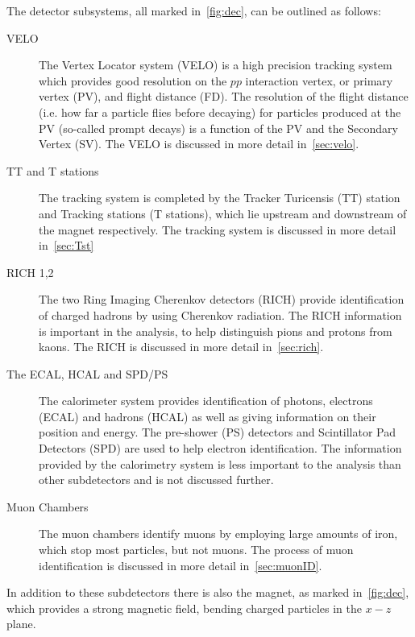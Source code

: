 The detector subsystems, all marked in~\autoref{fig:dec}, can be outlined as follows:
\begin{description}
\item [VELO] The Vertex Locator system (\Gls{VELO}) is a high precision tracking system which provides good resolution on the $pp$ interaction vertex, or primary vertex (\Gls{PV}), and flight distance (\Gls{FD}). The resolution of the flight distance (i.e. how far a particle flies before decaying) for particles produced at the PV (so-called \gls{prompt} decays) is a function of the PV and the Secondary Vertex (SV). The VELO is discussed in more detail in~\autoref{sec:velo}.
\item [TT and T stations] The tracking system is completed by the Tracker Turicensis (TT) station and Tracking stations (T stations), which lie upstream and downstream of the magnet respectively. The tracking system is discussed in more detail in~\autoref{sec:Tst} %
\item [RICH 1,2] The two Ring Imaging Cherenkov detectors (\Gls{RICH}) provide identification of charged hadrons by using Cherenkov radiation. The RICH information is important in the \Lbpi analysis, to help distinguish pions and protons from kaons. The RICH is discussed in more detail in~\autoref{sec:rich}.
\item [The ECAL, HCAL and SPD/PS] The calorimeter system provides identification of photons, electrons (\Gls{ECAL}) and hadrons (\Gls{HCAL}) as well as giving information on their position and energy. The pre-shower (\Gls{PS}) detectors and Scintillator Pad Detectors (\Gls{SPD}) are used to help electron identification. The information provided by the calorimetry system is less important to the \Lbpi analysis than other subdetectors and is not discussed further.
\item [Muon Chambers]  The muon chambers identify muons by employing large amounts of iron, which stop most particles, but not muons. The process of muon identification is discussed in more detail in~\autoref{sec:muonID}.
\end{description}

In addition to these subdetectors there is also the magnet, as marked in~\autoref{fig:dec}, which provides a strong magnetic field, bending charged particles in the $x - z$ plane. %


